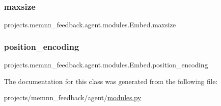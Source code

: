 \subsubsection{\texorpdfstring{maxsize}{maxsize}}
{\footnotesize\ttfamily projects.\+memnn\+\_\+feedback.\+agent.\+modules.\+Embed.\+maxsize\hspace{0.3cm}{\ttfamily [static]}}

\mbox{\label{classprojects_1_1memnn__feedback_1_1agent_1_1modules_1_1Embed_a53464118dd2c6052e8ce44978c573c27}} 
\subsubsection{\texorpdfstring{position\+\_\+encoding}{position\_encoding}}
{\footnotesize\ttfamily projects.\+memnn\+\_\+feedback.\+agent.\+modules.\+Embed.\+position\+\_\+encoding}



The documentation for this class was generated from the following file\+:\begin{DoxyCompactItemize}
\item 
projects/memnn\+\_\+feedback/agent/\hyperlink{projects_2memnn__feedback_2agent_2modules_8py}{modules.\+py}\end{DoxyCompactItemize}
